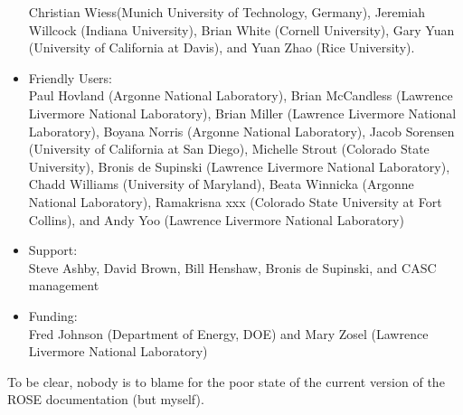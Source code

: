 \begin{itemize}
           Christian Wiess(Munich University of Technology, Germany), 
           Jeremiah Willcock (Indiana University),
           Brian White (Cornell University),
           Gary Yuan (University of California at Davis), and
           Yuan Zhao (Rice University).
     \item Friendly Users: \\
           Paul Hovland (Argonne National Laboratory),
           Brian McCandless (Lawrence Livermore National Laboratory),
           Brian Miller (Lawrence Livermore National Laboratory),
           Boyana Norris (Argonne National Laboratory),
           Jacob Sorensen (University of California at San Diego),
           Michelle Strout (Colorado State University),
           Bronis de Supinski (Lawrence Livermore National Laboratory),
           Chadd Williams (University of Maryland),
           Beata Winnicka (Argonne National Laboratory),
           Ramakrisna xxx (Colorado State University at Fort Collins), and
           Andy Yoo (Lawrence Livermore National Laboratory)
     \item Support: \\
           Steve Ashby,
           David Brown,
           Bill Henshaw,
           Bronis de Supinski, and
           CASC management
     \item Funding: \\
           Fred Johnson (Department of Energy, DOE) and
           Mary Zosel (Lawrence Livermore National Laboratory)
\end{itemize}


To be clear, nobody is to blame for the poor state of the current version of the 
ROSE documentation (but myself).






